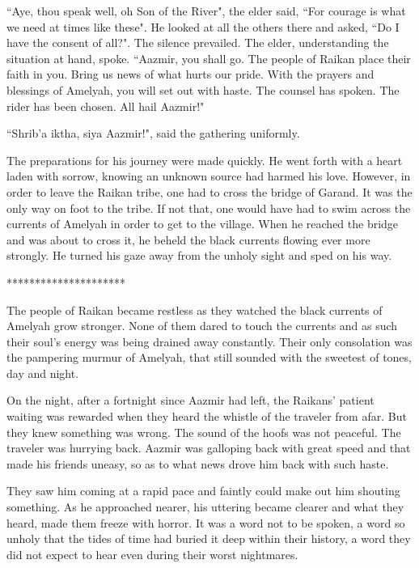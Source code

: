 \documentclass[twoside,11pt,titlepage]{article}
\begin{document}
``Aye, thou speak well, oh Son of the River", the elder said, ``For courage is what we need at times like these". He looked at all the others there and asked, ``Do I have the consent of all?". The silence prevailed. The elder, understanding the situation at hand, spoke. ``Aazmir, you shall go. The people of Raikan place their faith in you. Bring us news of what hurts our pride. With the prayers and blessings of Amelyah, you will set out with haste. The counsel has spoken. The rider has been chosen. All hail Aazmir!"

``Shrib'a iktha, siya Aazmir!", said the gathering uniformly.

The preparations for his journey were made quickly. He went forth with a heart laden with sorrow, knowing an unknown source had harmed his love. However, in order to leave the Raikan tribe, one had to cross the bridge of Garand. It was the only way on foot to the tribe. If not that, one would have had to swim across the currents of Amelyah in order to get to the village. When he reached the bridge and was about to cross it, he beheld the black currents flowing ever more strongly. He turned his gaze away from the unholy sight and sped on his way.

\bigskip
\begin{center}
*********************
\end{center}

The people of Raikan became restless as they watched the black currents of Amelyah grow stronger. None of them dared to touch the currents and as such their soul’s energy was being drained away constantly. Their only consolation was the pampering murmur of Amelyah, that still sounded with the sweetest of tones, day and night.

On the night, after a fortnight since Aazmir had left, the Raikans' patient waiting was rewarded when they heard the whistle of the traveler from afar. But they knew something was wrong. The sound of the hoofs was not peaceful. The traveler was hurrying back. Aazmir was galloping back with great speed and that made his friends uneasy, so as to what news drove him back with such haste.

They saw him coming at a rapid pace and faintly could make out him shouting something. As he approached nearer, his uttering became clearer and what they heard, made them freeze with horror. It was a word not to be spoken, a word so unholy that the tides of time had buried it deep within their history, a word they did not expect to hear even during their worst nightmares.
\end{document}
